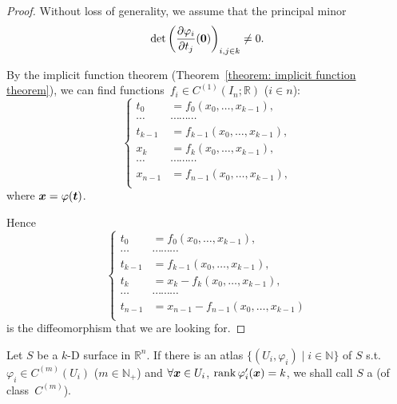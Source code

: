 \documentclass[openany]{book}
\DeclareMathOperator{\rank}{rank}
\begin{document}
\begin{proof}
	Without loss of generality, we assume that the principal minor
	\begin{equation*}
		\det \left( 
			\pdiff{\varphi_i}{t_j}(\bv 0)
		 \right)_{i, j \in k} \neq 0.
	\end{equation*}

	By the implicit function theorem (Theorem~\ref{theorem: implicit function theorem}), we can find functions~$f_i \in C^{(1)}(I_n; \mathbb R)$ ($i \in n$):
	\begin{equation*}
		\left\{
			\begin{aligned}
				t_0 &= f_0(x_0, \ldots, x_{k-1}), \\
				\cdots&\cdots\cdots\cdots \\
				t_{k-1} &= f_{k-1}(x_0, \ldots, x_{k-1}), \\
				x_k &= f_k(x_0, \ldots, x_{k-1}), \\
				\cdots&\cdots\cdots\cdots \\
				x_{n-1} &= f_{n-1}(x_0, \ldots, x_{k-1}), \\
			\end{aligned}
		\right.
	\end{equation*}
	where $\boldsymbol{x} = \varphi(\boldsymbol{t})$. 

	Hence
	\begin{equation*}
		\left\{
			\begin{aligned}
				t_0 &= f_0(x_0, \ldots, x_{k-1}), \\
				\cdots&\cdots\cdots\cdots \\
				t_{k-1} &= f_{k-1}(x_0, \ldots, x_{k-1}), \\
				t_k &= x_k - f_k(x_0, \ldots, x_{k-1}), \\
				\cdots&\cdots\cdots\cdots \\
				t_{n-1} &= x_{n-1} - f_{n-1}(x_0, \ldots, x_{k-1}) \\
			\end{aligned}
		\right.
	\end{equation*}
	is the diffeomorphism that we are looking for.

\end{proof}

\begin{definition}
	\label{definition: smooth surface}
	Let $S$ be a $k$-D surface in $\mathbb R^n$.
	If there is an atlas $\{(U_i, \varphi_i) \mid i \in \mathbb N\}$ of $S$ s.t.\ $\varphi_i \in C^{(m)}(U_i)$ ($m \in \mathbb N_+$) and $\forall \boldsymbol{x} \in U_i$, $\rank \varphi_i'(\bv x) = k$, we shall call $S$ a  (of class~$C^{(m)}$).
\end{definition}
\end{document}
